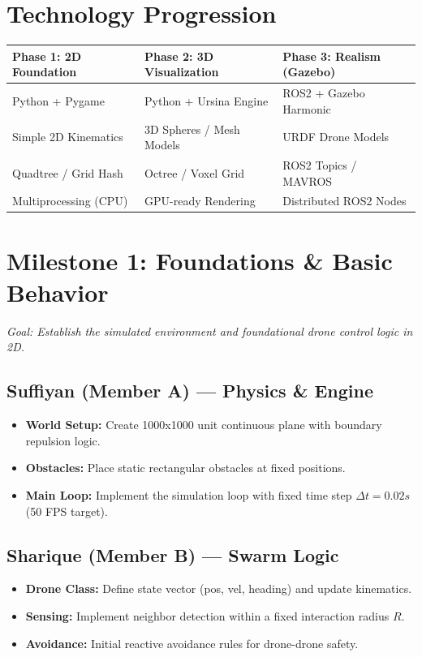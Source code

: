 \documentclass[11pt,a4paper]{article}
\begin{document}
\section{Technology Progression}
\begin{center}
\begin{tabularx}{\textwidth}{X X X}
\toprule
\textbf{Phase 1: 2D Foundation} & \textbf{Phase 2: 3D Visualization} & \textbf{Phase 3: Realism (Gazebo)} \\
\midrule
Python + Pygame & Python + Ursina Engine & ROS2 + Gazebo Harmonic \\
Simple 2D Kinematics & 3D Spheres / Mesh Models & URDF Drone Models \\
Quadtree / Grid Hash & Octree / Voxel Grid & ROS2 Topics / MAVROS \\
Multiprocessing (CPU) & GPU-ready Rendering & Distributed ROS2 Nodes \\
\bottomrule
\end{tabularx}
\end{center}

\section{Milestone 1: Foundations \& Basic Behavior}
\textit{Goal: Establish the simulated environment and foundational drone control logic in 2D.}

\subsection{Suffiyan (Member A) --- Physics \& Engine}
\begin{itemize}[noitemsep]
    \item \textbf{World Setup:} Create 1000x1000 unit continuous plane with boundary repulsion logic.
    \item \textbf{Obstacles:} Place static rectangular obstacles at fixed positions.
    \item \textbf{Main Loop:} Implement the simulation loop with fixed time step $\Delta t = 0.02s$ (50 FPS target).
\end{itemize}

\subsection{Sharique (Member B) --- Swarm Logic}
\begin{itemize}[noitemsep]
    \item \textbf{Drone Class:} Define state vector (pos, vel, heading) and update kinematics.
    \item \textbf{Sensing:} Implement neighbor detection within a fixed interaction radius $R$.
    \item \textbf{Avoidance:} Initial reactive avoidance rules for drone-drone safety.
\end{itemize}
\end{document}
